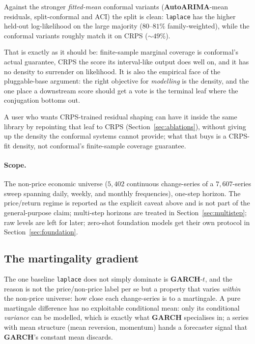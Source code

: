 \documentclass[article]{jss}
\providecommand{\pkg}[1]{\textbf{#1}}
\providecommand{\code}[1]{\texttt{#1}}
\begin{document}
Against the stronger
\emph{fitted-mean} conformal variants (\pkg{AutoARIMA}-mean residuals,
split-conformal and ACI) the split is clean: \code{laplace} has the
higher held-out log-likelihood on the large majority ($80$--$81\%$
family-weighted), while the conformal variants roughly match it on CRPS
($\sim 49\%$).

That is exactly as it should be: finite-sample marginal coverage is
conformal's actual guarantee, CRPS the score its interval-like output does well
on, and it has no density to surrender on likelihood. It is also the
empirical face of the pluggable-base argument: the
right objective for \emph{modelling} is the density, and the one place a
downstream score should get a vote is the terminal leaf where the conjugation
bottoms out.

A user who wants CRPS-trained
residual shaping can have it inside the same library by repointing that leaf to
CRPS (Section~\ref{sec:ablations}), without giving up the density the conformal
systems cannot provide; what that buys is a CRPS-fit density, not conformal's
finite-sample coverage guarantee.

\paragraph{Scope.}
The non-price economic universe ($5{,}402$ continuous change-series of a
$7{,}607$-series sweep spanning daily, weekly, and monthly frequencies), one-step
horizon. The price/return regime is reported as the explicit caveat
above and is not part of the general-purpose claim; multi-step horizons are
treated in Section~\ref{sec:multistep}; raw levels are left for later; zero-shot
foundation models get their own protocol in Section~\ref{sec:foundation}.

\subsection{The martingality gradient} \label{sec:martingality}

The one baseline \code{laplace} does not simply dominate is \pkg{GARCH}-$t$, and
the reason is not the price/non-price label per se but a property that varies
\emph{within} the non-price universe: how close each change-series is to a
martingale. A pure martingale difference has no exploitable conditional mean:
only its conditional \emph{variance} can be modelled, which is exactly what
\pkg{GARCH} specialises in; a series with mean structure (mean reversion,
momentum) hands a forecaster signal that \pkg{GARCH}'s constant mean discards.
\end{document}
